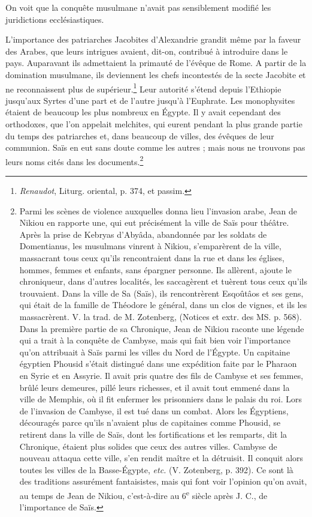 \documentclass[a4paper, 11pt, oneside]{article}
\begin{document}
On voit que la conquête musulmane n'avait pas sensiblement modifié les juridictions ecclésiastiques.

L'importance des patriarches Jacobites d'Alexandrie grandit même par la faveur des Arabes, que leurs intrigues avaient, dit-on, contribué à introduire dans le pays. Auparavant ils admettaient la primauté de l'évêque de Rome. A partir de la domination musulmane, ils deviennent les chefs incontestés de la secte Jacobite et ne reconnaissent plus de supérieur.\footnote{\emph{Renaudot}, Liturg. oriental, p. 374, et passim.} Leur autorité s'étend depuis l'Ethiopie jusqu'aux Syrtes d'une part et de l'autre jusqu'à l'Euphrate. Les monophysites étaient de beaucoup les plus nombreux en Égypte. Il y avait cependant des orthodoxes, que l'on appelait melchites, qui eurent pendant la plus grande partie du temps des patriarches et, dans beaucoup de villes, des évêques de leur communion. Saïs en eut sans doute comme les autres ; mais nous ne trouvons pas leurs noms cités dans les documents.\footnote{Parmi les scènes de violence auxquelles donna lieu l'invasion arabe, Jean de Nikiou en rapporte une, qui eut précisément la ville de Saïs pour théâtre. Après la prise de Kebryas d'Abyâda, abandonnée par les soldats de Domentianus, les musulmans vinrent à Nikiou, s'emparèrent de la ville, massacrant tous ceux qu'ils rencontraient dans la rue et dans les églises, hommes, femmes et enfants, sans épargner personne. Ils allèrent, ajoute le chroniqueur, dans d'autres localités, les saccagèrent et tuèrent tous ceux qu'ils trouvaient. Dans la ville de Sa (Saïs), ils rencontrèrent Esqoûtâos et ses gens, qui était de la famille de Théodore le général, dans un clos de vignes, et ils les massacrèrent. V. la trad. de M. Zotenberg, (Notices et extr. des MS. p. 568).\\\hspace*{5mm}Dans la première partie de sa Chronique, Jean de Nikiou raconte une légende qui a trait à la conquête de Cambyse, mais qui fait bien voir l'importance qu'on attribuait à Saïs parmi les villes du Nord de l'Égypte. Un capitaine égyptien Phousid s'était distingué dans une expédition faite par le Pharaon en Syrie et en Assyrie. Il avait pris quatre des fils de Cambyse et ses femmes, brûlé leurs demeures, pillé leurs richesses, et il avait tout emmené dans la ville de Memphis, où il fit enfermer les prisonniers dans le palais du roi. Lors de l'invasion de Cambyse, il est tué dans un combat. Alors les Égyptiens, découragés parce qu’ils n'avaient plus de capitaines comme Phousid, se retirent dans la ville de Saïs, dont les fortifications et les remparts, dit la Chronique, étaient plus solides que ceux des autres villes. Cambyse de nouveau attaqua cette ville, s'en rendit maître et la détruisit. Il conquit alors toutes les villes de la Basse-Égypte, \emph{etc.} (V. Zotenberg, p. 392). Ce sont là des traditions assurément fantaisistes, mais qui font voir l'opinion qu'on avait, au temps de Jean de Nikiou, c'est-à-dire au 6\textsuperscript{e} siècle après J. C., de l'importance de Saïs.}
\end{document}

